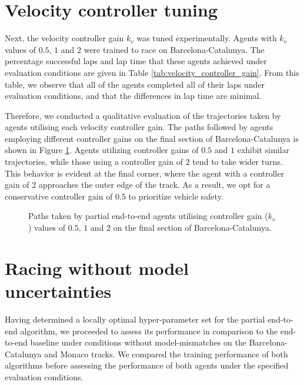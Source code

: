 \section{Velocity controller tuning}

Next, the velocity controller gain $k_v$ was tuned experimentally.
Agents with $k_v$ values of $0.5$, $1$ and $2$ were trained to race on Barcelona-Catalunya.
The percentage successful laps and lap time that these agents achieved under evaluation conditions are given in Table \ref{tab:velocity_controller_gain}.
From this table, we observe that all of the agents completed all of their laps under evaluation conditions, and that the differences in lap time are minimal.



Therefore, we conducted a qualitative evaluation of the trajectories taken by agents utilising each velocity controller gain.
The paths followed by agents employing different controller gains on the final section of Barcelona-Catalunya is shown in Figure \ref{fig:kv_paths}.
Agents utilizing controller gains of $0.5$ and $1$ exhibit similar trajectories, while those using a controller gain of $2$ tend to take wider turns. 
This behavior is evident at the final corner, where the agent with a controller gain of $2$ approaches the outer edge of the track. 
As a result, we opt for a conservative controller gain of $0.5$ to prioritize vehicle safety.

\begin{figure}[htb!]
    \centering
    
    \caption[Paths taken by partial end-to-end agents utilising controller gain ($k_v$) values of $0.5$, $1$ and $2$ on the final section of  Barcelona-Catalunya]{Paths taken by partial end-to-end agents utilising controller gain ($k_v$) values of $0.5$, $1$ and $2$ on the final section of  Barcelona-Catalunya.}
    \label{fig:kv_paths}
\end{figure}









\section{Racing without model uncertainties}

Having determined a locally optimal hyper-parameter set for the partial end-to-end algorithm, we proceeded to assess its performance in comparison to the end-to-end baseline under conditions without model-mismatches on the Barcelona-Catalunya and Monaco tracks. 
We compared the training performance of both algorithms before assessing the performance of both agents under the specified evaluation conditions.


